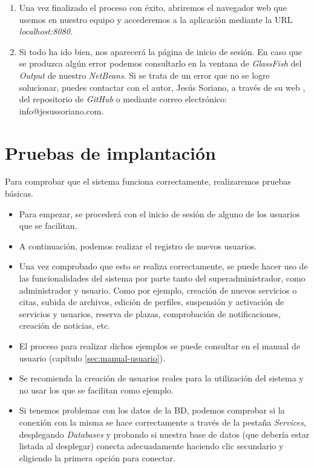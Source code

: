 \begin{enumerate}
\item Una vez finalizado el proceso con éxito, abriremos el navegador web que usemos en nuestro equipo y accederemos a la aplicación mediante la URL \textit{localhost:8080}. 

\item Si todo ha ido bien, nos aparecerá la página de inicio de sesión. En caso que se produzca algún error podemos consultarlo en la ventana de \textit{GlassFish} del \textit{Output} de nuestro \textit{NetBeans}. Si se trata de un error que no se logre solucionar, puedes contactar con el autor, Jesús Soriano, a través de su web \cite{JesusSoriano}, del repositorio de \textit{GitHub} \cite{github-booking} o mediante correo electrónico: info@jesussoriano.com.
\end{enumerate}


\section{Pruebas de implantación}

Para comprobar que el sistema funciona correctamente, realizaremos pruebas básicas. 

\begin{itemize}
\item Para empezar, se procederá con el inicio de sesión de alguno de los usuarios que se facilitan.
\item A continuación, podemos realizar el registro de nuevos usuarios.
\item Una vez comprobado que esto se realiza correctamente, se puede hacer uso de las funcionalidades del sistema por parte tanto del superadministrador, como administrador y usuario. Como por ejemplo, creación de nuevos servicios o citas, subida de archivos, edición de perfiles, suspensión y activación de servicios y usuarios, reserva de plazas, comprobación de notificaciones, creación de noticias, etc. 
\item El proceso para realizar dichos ejemplos se puede consultar en el manual de usuario (capítulo \ref{sec:manual-usuario}).
\item Se recomienda la creación de usuarios reales para la utilización del sistema y no usar los que se facilitan como ejemplo. 
\item Si tenemos problemas con los datos de la BD, podemos comprobar si la conexión con la misma se hace correctamente a través de la pestaña \textit{Services}, desplegando \textit{Databases} y probando si nuestra base de datos (que debería estar listada al desplegar) conecta adecuadamente haciendo clic secundario y eligiendo la primera opción para conectar.
\end{itemize}


